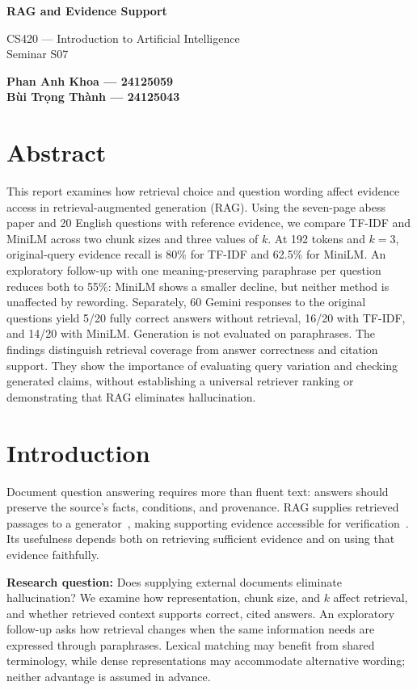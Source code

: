 \documentclass[12pt,a4paper]{article}
\begin{document}
\begin{center}
{\LARGE\bfseries RAG and Evidence Support\par}
\vspace{8pt}{\large Comparing TF-IDF and Embedding Retrieval on an Open ML Corpus}\par
CS420 — Introduction to Artificial Intelligence\\
Seminar S07\par
\textbf{Phan Anh Khoa — 24125059}\\
\textbf{Bùi Trọng Thành — 24125043}
\end{center}
\section*{Abstract}
This report examines how retrieval choice and question wording affect evidence access in retrieval-augmented generation (RAG). Using the seven-page abess paper and 20 English questions with reference evidence, we compare TF-IDF and MiniLM across two chunk sizes and three values of $k$. At 192 tokens and $k=3$, original-query evidence recall is 80\% for TF-IDF and 62.5\% for MiniLM. An exploratory follow-up with one meaning-preserving paraphrase per question reduces both to 55\%: MiniLM shows a smaller decline, but neither method is unaffected by rewording. Separately, 60 Gemini responses to the original questions yield 5/20 fully correct answers without retrieval, 16/20 with TF-IDF, and 14/20 with MiniLM. Generation is not evaluated on paraphrases. The findings distinguish retrieval coverage from answer correctness and citation support. They show the importance of evaluating query variation and checking generated claims, without establishing a universal retriever ranking or demonstrating that RAG eliminates hallucination.
\section{Introduction}
Document question answering requires more than fluent text: answers should preserve the source's facts, conditions, and provenance. RAG supplies retrieved passages to a generator~\cite{lewis}, making supporting evidence accessible for verification~\cite{schneider}. Its usefulness depends both on retrieving sufficient evidence and on using that evidence faithfully.

\textbf{Research question:} Does supplying external documents eliminate hallucination? We examine how representation, chunk size, and $k$ affect retrieval, and whether retrieved context supports correct, cited answers. An exploratory follow-up asks how retrieval changes when the same information needs are expressed through paraphrases. Lexical matching may benefit from shared terminology, while dense representations may accommodate alternative wording; neither advantage is assumed in advance.
\end{document}
